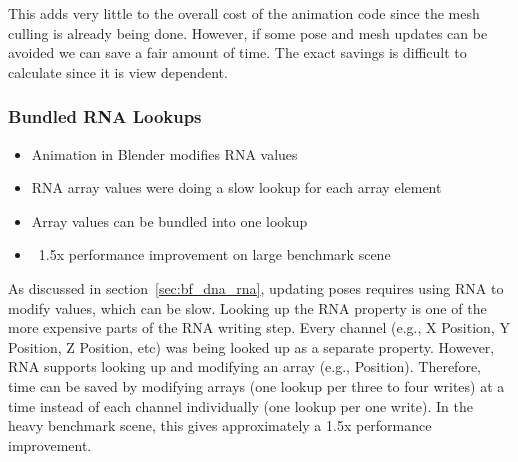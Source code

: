 
This adds very little to the overall cost of the animation code since the mesh culling is already being done. However, if some pose and mesh updates can be avoided we can save a fair amount of time. The exact savings is difficult to calculate since it is view dependent. 

\subsubsection{Bundled RNA Lookups}
\ifsummaries
\begin{itemize}
 \item Animation in Blender modifies RNA values
 \item RNA array values were doing a slow lookup for each array element
 \item Array values can be bundled into one lookup
 \item ~1.5x performance improvement on large benchmark scene
\end{itemize}
\fi

As discussed in section~\ref{sec:bf_dna_rna}, updating poses requires using RNA to modify values, which can be slow. Looking up the RNA property is one of the more expensive parts of the RNA writing step. Every channel (e.g., X Position, Y Position, Z Position, etc) was being looked up as a separate property. However, RNA supports looking up and modifying an array (e.g., Position). Therefore, time can be saved by modifying arrays (one lookup per three to four writes) at a time instead of each channel individually (one lookup per one write). In the heavy benchmark scene, this gives approximately a 1.5x performance improvement.

